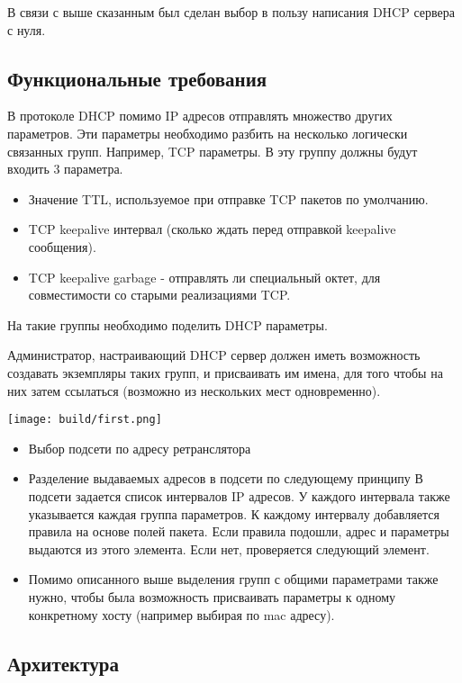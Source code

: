 \documentclass[12pt]{article}
\begin{document}
В связи с выше сказанным был сделан выбор в пользу написания DHCP сервера с нуля.

\subsection{Функциональные требования}

В протоколе DHCP помимо IP адресов отправлять множество других параметров.
Эти параметры необходимо разбить на несколько логически связанных групп.
Например, TCP параметры. В эту группу должны будут входить 3 параметра.

\begin{itemize}
    \item Значение TTL, используемое при отправке TCP пакетов по умолчанию.
    \item TCP keepalive интервал (сколько ждать перед отправкой keepalive сообщения).
    \item TCP keepalive garbage - отправлять ли специальный октет, для совместимости со старыми реализациями TCP.
\end{itemize}

На такие группы необходимо поделить DHCP параметры.

Администратор, настраивающий DHCP сервер должен иметь возможность создавать экземпляры таких групп, и присваивать им имена, для того чтобы на них затем ссылаться (возможно из нескольких мест одновременно).

\texttt{[image: build/first.png]}

\begin{itemize}
    \item Выбор подсети по адресу ретранслятора
    \item Разделение выдаваемых адресов в подсети по следующему принципу
        \subitem В подсети задается список интервалов IP адресов.
        \subitem У каждого интервала также указывается каждая группа параметров.
        \subitem К каждому интервалу добавляется правила на основе полей пакета.
        \subitem Если правила подошли, адрес и параметры выдаются из этого элемента.
        \subitem Если нет, проверяется следующий элемент.
    \item Помимо описанного выше выделения групп с общими параметрами также нужно, чтобы была возможность присваивать параметры к одному конкретному хосту (например выбирая по mac адресу).
\end{itemize}

\subsection{Архитектура}
\end{document}
